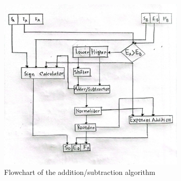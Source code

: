 \documentclass{article}
\begin{document}
\begin{figure}[h!]
    \centering
    \includegraphics[width=0.8\textwidth]{flowchart.jpg}%
    \caption{Flowchart of the addition/subtraction algorithm}
    \label{fig:flowchart}
\end{figure}








\end{document}
